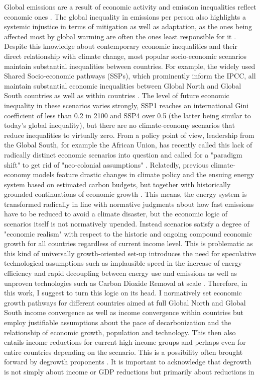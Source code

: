 \documentclass{article}
\begin{document}
Global emissions are a result of economic activity and emission inequalities reflect economic ones \parencite{chancel2022global, hubacek2017global, oswald2020large, ravallion2000carbon, hailemariam2020carbon, knight2017wealth}. The global inequality in emissions per person also highlights a systemic injustice in terms of mitigation as well as adaptation, as the ones being affected most by global warming are often the ones least responsible for it
\parencite{althor2016global}. Despite this knowledge about contemporary economic inequalities and their direct relationship with climate change, most popular socio-economic scenarios maintain substantial inequalities between countries. For example, the widely used Shared Socio-economic pathways (SSPs), which prominently inform the IPCC, all maintain substantial economic inequalities between Global North and Global South countries \parencite{benveniste2021tracing} as well as within countries \parencite{rao2019income}. The level of future economic inequality in these scenarios varies strongly, SSP1 reaches an international Gini coefficient of less than 0.2 in 2100 and SSP4 over 0.5 (the latter being similar to today's global inequality), but there are no climate-economy scenarios that reduce inequalities to virtually zero. From a policy point of view, leadership from the Global South, for example the African Union, has recently called this lack of radically distinct economic scenarios into question and called for a "paradigm shift" to get rid of "neo-colonial assumptions" \parencite{africanarguments2024modelling}. Relatedly, previous climate-economy models feature drastic changes in climate policy and the ensuing energy system based on estimated carbon budgets, but together with historically grounded continuations of economic growth \parencite{riahi2017shared}. This means, the energy system is transformed radically in line with normative judgments about how fast emissions have to be reduced to avoid a climate disaster, but the economic logic of scenarios itself is not normatively upended. Instead scenarios satisfy a degree of "economic realism" with respect to the historic and ongoing compound economic growth for all countries regardless of current income level. This is problematic as this kind of universally growth-oriented set-up introduces the need for speculative technological assumptions such as implausible speed in the increase of energy efficiency and rapid decoupling between energy use and emissions as well as unproven technologies such as Carbon Dioxide Removal at scale \parencite{lamb2024carbon}. Therefore, in this work, I suggest to turn this logic on its head. I normatively set economic growth pathways for different countries aimed at full Global North and Global South income convergence as well as income convergence within countries but employ justifiable assumptions about the pace of decarbonization and the relationship of economic growth, population and technology. This then also entails income reductions for current high-income groups and perhaps even for entire countries depending on the scenario. This is a possibility often brought forward by degrowth proponents \parencite{hickel2021does}. It is important to acknowledge that degrowth is not simply about income or GDP reductions but primarily about reductions in 
\end{document}

